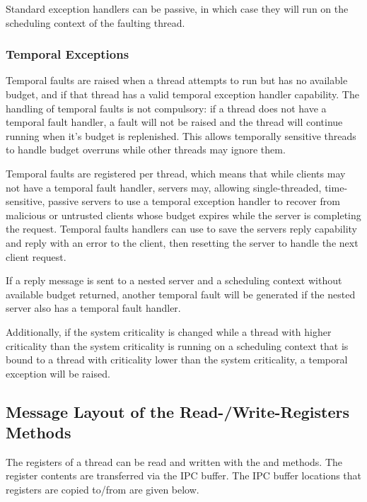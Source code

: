 Standard exception handlers can be passive, in which case they will run on the scheduling context of the faulting thread.

\subsubsection{Temporal Exceptions}
\label{sec:temporal-exceptions}

Temporal faults are raised when a thread attempts to run but has no available budget, and if that thread has a valid temporal exception handler capability.
The handling of temporal faults is not compulsory: if a thread does not have a temporal fault handler, a fault will not be raised and the thread will continue running when it's budget is replenished.
This allows temporally sensitive threads to handle budget overruns while other threads may ignore them.

Temporal faults are registered per thread, which means that while clients may not have a temporal fault handler, servers may, allowing single-threaded, time-sensitive, passive servers to use a temporal exception handler to recover from malicious or untrusted clients whose budget expires while the server is completing the request.
Temporal faults handlers can use  to save the servers reply capability and reply with an error to the client, then resetting the server to handle the next client request.

If a reply message is sent to a nested server and a scheduling context without available budget returned, another temporal fault will be generated if the nested server also has a temporal fault handler.

Additionally, if the system criticality is changed while a thread with higher criticality than the system criticality is running on a scheduling context that is bound to a thread with criticality lower than the system criticality, a temporal exception will be raised. 

\subsection{Message Layout of the Read-/Write-Registers Methods}
\label{sec:read_write_registers}

The registers of a thread can be read and written with the
 and  methods. The register contents are transferred via the IPC buffer. The IPC buffer locations that registers are copied to/from are given below.

